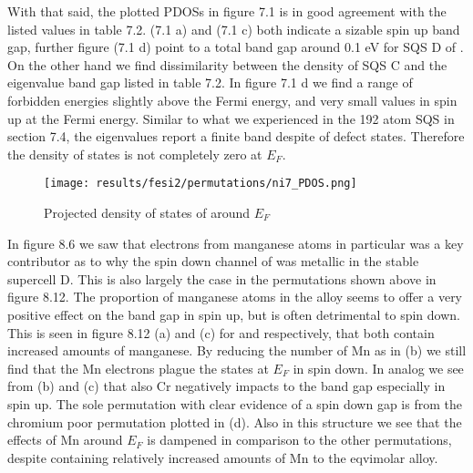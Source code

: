 With that said, the plotted PDOSs in figure 7.1 is in good agreement with the listed values in table 7.2.  (7.1 a) and  (7.1 c) both indicate a sizable spin up band gap, further figure (7.1 d) point to a total band gap around 0.1 eV for SQS D of . On the other hand we find dissimilarity between the density of  SQS C and the eigenvalue band gap listed in table 7.2. In figure 7.1 d we find a range of forbidden energies slightly above the Fermi energy, and very small values in spin up at the Fermi energy. Similar to what we experienced in the 192 atom SQS in section 7.4, the eigenvalues report a finite band despite of defect states. Therefore the density of states is not completely zero at $E_F$. 

\begin{figure}[H]
	\centering
	\texttt{[image: results/fesi2/permutations/ni7\_PDOS.png]}
	\caption{Projected density of states of  around $E_F$}
\end{figure}

In figure 8.6 we saw that electrons from manganese atoms in particular was a key contributor as to why the spin down channel of  was metallic in the stable supercell D. This is also largely the case in the permutations shown above in figure 8.12. The proportion of manganese atoms in the alloy seems to offer a very positive effect on the band gap in spin up, but is often detrimental to spin down. This is seen in figure 8.12 (a) and (c) for  and  respectively, that both contain increased amounts of manganese. By reducing the number of Mn as in (b) we still find that the Mn electrons plague the states at $E_F$ in spin down. In analog we see from (b) and (c) that also Cr negatively impacts to the band gap especially in spin up. The sole permutation with clear evidence of a spin down gap is from the chromium poor permutation plotted in (d). Also in this structure we see that the effects of Mn around $E_F$ is dampened in comparison to the other permutations, despite containing relatively increased amounts of Mn to the eqvimolar alloy.  

